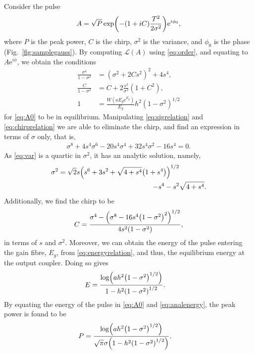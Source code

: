 \documentclass[9pt,twocolumn,twoside]{osajnl}
\let\originalleft\left
\let\originalright\right
\renewcommand{\left}{\mathopen{}\mathclose\bgroup\originalleft}
\renewcommand{\right}{\aftergroup\egroup\originalright}
\begin{document}
Consider the pulse
\begin{align}
	A = \sqrt{P} \exp \left( -(1 + iC) \frac{T^2}{2 \sigma^2} \right) \textrm{e}^{i \phi_0},
	\label{eq:A0}
\end{align}
where $P$ is the peak power, $C$ is the chirp, $\sigma^2$ is the variance, and $\phi_0$ is the phase (Fig.~\ref{fig:samplegauss}). By computing $\mathcal{L}(A)$ using \eqref{eq:order}, and equating to $A \textrm{e}^{i \phi}$, we obtain the conditions
\begin{align}
	\frac{\sigma^4}{1 - \sigma^2} &= (\sigma^2 + 2 C s^2)^2 + 4 s^4, \label{eq:sigrelation} \\
	\frac{C}{1 - \sigma^2} &= C + 2 \frac{s^2}{\sigma^2} (1 + C^2), \label{eq:chirprelation} \\
	1 &= \frac{W(a E_g \textrm{e}^{E_g})}{E_g} h^2 (1 - \sigma^2)^{1/2} \label{eq:energyrelation}
\end{align}
for \eqref{eq:A0} to be in equilibrium. Manipulating \eqref{eq:sigrelation} and \eqref{eq:chirprelation} we are able to eliminate the chirp, and find an expression in terms of $\sigma$ only, that is,
\begin{align}
	\sigma^8 + 4 s^4 \sigma^6 - 20 s^4 \sigma^4 + 32 s^4 \sigma^2 - 16 s^4 = 0. \label{eq:var}
\end{align}
As \eqref{eq:var} is a quartic in $\sigma^2$, it has an analytic solution, namely,
\begin{equation}
	\begin{split}
		\sigma^2 = \sqrt{2} s \left( s^6 + 3s^2 + \sqrt{4 + s^4} \left( 1 + s^4 \right) \right)^{1/2} & \\
		- s^4 - s^2 & \sqrt{4 + s^4}.
		\label{eq:equilvar}
	\end{split}
\end{equation}
Additionally, we find the chirp to be
\begin{align}
	C = \frac{\sigma^4 - \left( \sigma^8 - 16 s^4 \left( 1 - \sigma^2 \right)^2 \right)^{1/2}}{4 s^2 \left( 1 - \sigma^2 \right)},
	\label{eq:chirp}
\end{align}
in terms of $s$ and $\sigma^2$. Moreover, we can obtain the energy of the pulse entering the gain fibre, $E_g$, from \eqref{eq:energyrelation}, and thus, the equilibrium energy at the output coupler. Doing so gives
\begin{align}
	E &= \frac{\log \left( a h^2 \left( 1 - \sigma^2 \right)^{1/2} \right)}{1 - h^2 \left( 1 - \sigma^2 \right)^{1/2}}.
	\label{eq:analenergy}
\end{align}
By equating the energy of the pulse in \eqref{eq:A0} and \eqref{eq:analenergy}, the peak power is found to be
\begin{align}
	P &= \frac{\log \left( a h^2 \left( 1 - \sigma^2 \right)^{1/2} \right)}{\sqrt{\pi} \sigma \left( 1 - h^2 \left( 1 - \sigma^2 \right)^{1/2} \right)}.
	\label{eq:analpower}
\end{align}
\end{document}
